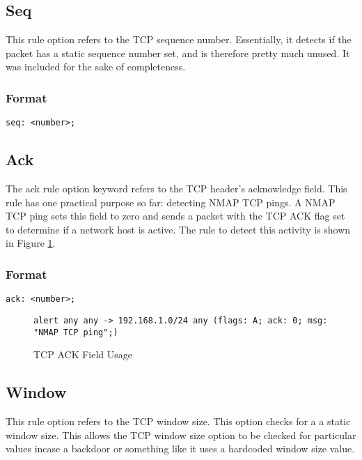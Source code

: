 \documentclass[english]{report}
\begin{document}
\subsection{Seq}

This rule option refers to the TCP sequence number. Essentially, it
detects if the packet has a static sequence number set, and is therefore
pretty much unused. It was included for the sake of completeness.


\subsubsection{Format}

\begin{verbatim}
seq: <number>;
\end{verbatim}

\subsection{Ack}

The ack rule option keyword refers to the TCP header's acknowledge
field. This rule has one practical purpose so far: detecting NMAP \cite{PhrackNMAParticle,nmaphomepage}
TCP pings. A NMAP TCP ping sets this field to zero and sends a packet
with the TCP ACK flag set to determine if a network host is active.
The rule to detect this activity is shown in Figure \ref{TCP ACK usage}.


\subsubsection{Format}

\begin{verbatim}
ack: <number>;
\end{verbatim}
%
\begin{figure}[!hbpt]
\begin{verbatim}
alert any any -> 192.168.1.0/24 any (flags: A; ack: 0; msg: "NMAP TCP ping";)
\end{verbatim}

\caption{\label{TCP ACK usage} TCP ACK Field Usage}
\end{figure}


\subsection{Window}

This rule option refers to the TCP window size.  This option checks
for a a static window size.  This allows the TCP window size option to
be checked for particular values incase a backdoor or something like
it uses a hardcoded window size value.
\end{document}
